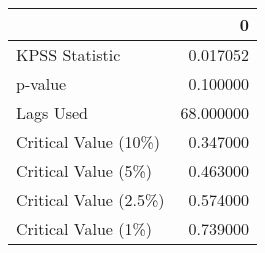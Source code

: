 \begin{tabular}{lr}
\toprule
{} &          0 \\
\midrule
KPSS Statistic        &   0.017052 \\
p-value               &   0.100000 \\
Lags Used             &  68.000000 \\
Critical Value (10\%)  &   0.347000 \\
Critical Value (5\%)   &   0.463000 \\
Critical Value (2.5\%) &   0.574000 \\
Critical Value (1\%)   &   0.739000 \\
\bottomrule
\end{tabular}
